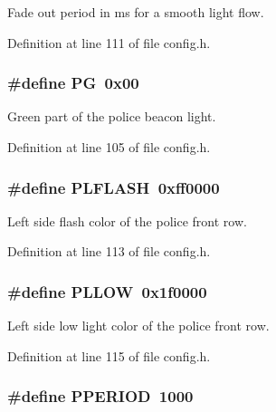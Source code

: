 Fade out period in ms for a smooth light flow. 



Definition at line 111 of file config.\+h.

\subsubsection[{\texorpdfstring{PG}{PG}}]{\setlength{\rightskip}{0pt plus 5cm}\#define PG~0x00}\hypertarget{group__police_ga037f1be1c3e45bf4d0d4f5ddc159ff30}{}\label{group__police_ga037f1be1c3e45bf4d0d4f5ddc159ff30}


Green part of the police beacon light. 



Definition at line 105 of file config.\+h.

\subsubsection[{\texorpdfstring{P\+L\+F\+L\+A\+SH}{PLFLASH}}]{\setlength{\rightskip}{0pt plus 5cm}\#define P\+L\+F\+L\+A\+SH~0xff0000}\hypertarget{group__police_ga6204e236d3e4ef0beb5b6fd976fecf43}{}\label{group__police_ga6204e236d3e4ef0beb5b6fd976fecf43}


Left side flash color of the police front row. 



Definition at line 113 of file config.\+h.

\subsubsection[{\texorpdfstring{P\+L\+L\+OW}{PLLOW}}]{\setlength{\rightskip}{0pt plus 5cm}\#define P\+L\+L\+OW~0x1f0000}\hypertarget{group__police_ga98673c164f8917ff7af0016ba30e7ca8}{}\label{group__police_ga98673c164f8917ff7af0016ba30e7ca8}


Left side low light color of the police front row. 



Definition at line 115 of file config.\+h.

\subsubsection[{\texorpdfstring{P\+P\+E\+R\+I\+OD}{PPERIOD}}]{\setlength{\rightskip}{0pt plus 5cm}\#define P\+P\+E\+R\+I\+OD~1000}\hypertarget{group__police_gaa5b3f73b18472f543c080194bf9c2e79}{}\label{group__police_gaa5b3f73b18472f543c080194bf9c2e79}


